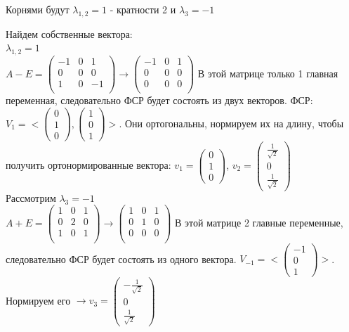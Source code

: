 \documentclass[a4paper,12pt]{article}
\begin{document}
\begin{enumerate}
Корнями будут $\lambda_{1,2} =1$ - кратности 2 и $\lambda_3 = -1$

Найдем собственные вектора:\\
$\lambda_{1,2} =1$\\
$A-E = \begin{pmatrix}
{-1}&{0}&{1}\\
{0}&{0}&{0}\\
{1}&{0}&{-1}\\
\end{pmatrix}\rightarrow\begin{pmatrix}
{-1}&{0}&{1}\\
{0}&{0}&{0}\\
{0}&{0}&{0}\\
\end{pmatrix}$ В этой матрице только 1 главная переменная, следовательно ФСР будет состоять из двух векторов. ФСР: $V_1=<\begin{pmatrix}
0\\
1\\
0
\end{pmatrix},\begin{pmatrix}
1\\
0\\
1
\end{pmatrix}>$. Они ортогональны, нормируем их на длину, чтобы получить ортонормированные вектора: $v_1 = \begin{pmatrix}
0\\
1\\
0
\end{pmatrix}$, $v_2 = \begin{pmatrix}
\frac{1}{\sqrt{2}}\\
0\\
\frac{1}{\sqrt{2}}
\end{pmatrix}$\\

Рассмотрим $\lambda_3 = -1$\\
$A+E = \begin{pmatrix}
{1}&{0}&{1}\\
{0}&{2}&{0}\\
{1}&{0}&{1}\\
\end{pmatrix}\rightarrow\begin{pmatrix}
{1}&{0}&{1}\\
{0}&{1}&{0}\\
{0}&{0}&{0}\\
\end{pmatrix}$ В этой матрице 2 главные переменные, следовательно ФСР будет состоять из одного вектора. $V_{-1}=<\begin{pmatrix}
-1\\
0\\
1
\end{pmatrix}>$. Нормируем его $\rightarrow v_3 = \begin{pmatrix}
-\frac{1}{\sqrt{2}}\\
0\\
\frac{1}{\sqrt{2}}
\end{pmatrix}$


\end{enumerate}
\end{document}
